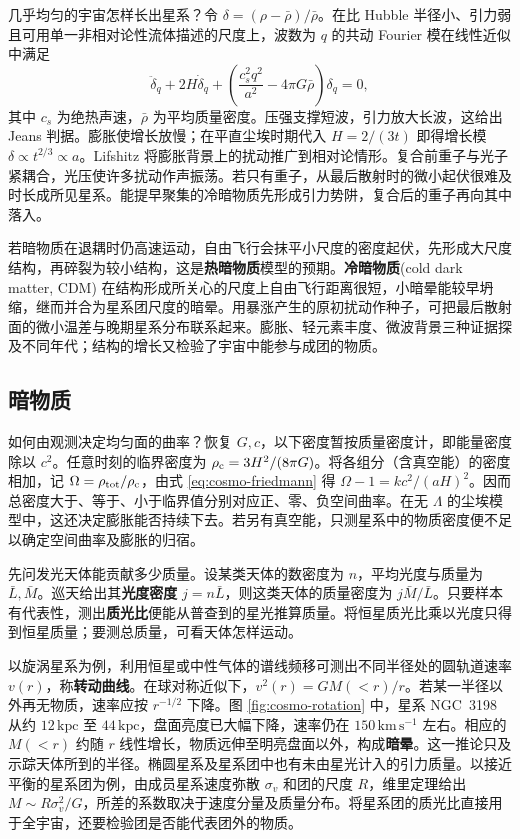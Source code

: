 几乎均匀的宇宙怎样长出星系？令 $\delta=(\rho-\bar\rho)/\bar\rho$。在比 Hubble 半径小、引力弱且可用单一非相对论性流体描述的尺度上，波数为 $q$ 的共动 Fourier 模在线性近似中满足
\[
   \ddot\delta_q+2H\dot\delta_q+
   \left(\frac{c_s^2q^2}{a^2}-4\pi G\bar\rho\right)\delta_q=0 ,
\]
其中 $c_s$ 为绝热声速，$\bar\rho$ 为平均质量密度。压强支撑短波，引力放大长波，这给出 Jeans 判据。膨胀使增长放慢；在平直尘埃时期代入 $H=2/(3t)$ 即得增长模 $\delta\propto t^{2/3}\propto a$。Lifshitz 将膨胀背景上的扰动推广到相对论情形。复合前重子与光子紧耦合，光压使许多扰动作声振荡。若只有重子，从最后散射时的微小起伏很难及时长成所见星系。能提早聚集的冷暗物质先形成引力势阱，复合后的重子再向其中落入。

若暗物质在退耦时仍高速运动，自由飞行会抹平小尺度的密度起伏，先形成大尺度结构，再碎裂为较小结构，这是\textbf{热暗物质}模型的预期。\textbf{冷暗物质}(cold dark matter, CDM) 在结构形成所关心的尺度上自由飞行距离很短，小暗晕能较早坍缩，继而并合为星系团尺度的暗晕。用暴涨产生的原初扰动作种子，可把最后散射面的微小温差与晚期星系分布联系起来。膨胀、轻元素丰度、微波背景三种证据探及不同年代；结构的增长又检验了宇宙中能参与成团的物质。

\subsection{暗物质}\label{sec:cosmo-dark-matter}

如何由观测决定均匀面的曲率？恢复 $G,c$，以下密度暂按质量密度计，即能量密度除以 $c^2$。任意时刻的临界密度为 $\rho_{\rm c}=3H^2/(8\pi G)$。将各组分（含真空能）的密度相加，记 $\Omega=\rho_{\rm tot}/\rho_{\rm c}$，由式 \eqref{eq:cosmo-friedmann} 得 $\Omega-1=kc^2/(aH)^2$。因而总密度大于、等于、小于临界值分别对应正、零、负空间曲率。在无 $\Lambda$ 的尘埃模型中，这还决定膨胀能否持续下去。若另有真空能，只测星系中的物质密度便不足以确定空间曲率及膨胀的归宿。

先问发光天体能贡献多少质量。设某类天体的数密度为 $n$，平均光度与质量为 $\bar L,\bar M$。巡天给出其\textbf{光度密度} $j=n\bar L$，则这类天体的质量密度为 $j\bar M/\bar L$。只要样本有代表性，测出\textbf{质光比}便能从普查到的星光推算质量。将恒星质光比乘以光度只得到恒星质量；要测总质量，可看天体怎样运动。

以旋涡星系为例，利用恒星或中性气体的谱线频移可测出不同半径处的圆轨道速率 $v(r)$，称\textbf{转动曲线}。在球对称近似下，$v^2(r)=GM(<r)/r$。若某一半径以外再无物质，速率应按 $r^{-1/2}$ 下降。图 \ref{fig:cosmo-rotation} 中，星系 NGC~3198 从约 $12\,\mathrm{kpc}$ 至 $44\,\mathrm{kpc}$，盘面亮度已大幅下降，速率仍在 $150\,\mathrm{km\,s^{-1}}$ 左右。相应的 $M(<r)$ 约随 $r$ 线性增长，物质远伸至明亮盘面以外，构成\textbf{暗晕}。这一推论只及示踪天体所到的半径。椭圆星系及星系团中也有未由星光计入的引力质量。以接近平衡的星系团为例，由成员星系速度弥散 $\sigma_v$ 和团的尺度 $R$，维里定理给出 $M\sim R\sigma_v^2/G$，所差的系数取决于速度分量及质量分布。将星系团的质光比直接用于全宇宙，还要检验团是否能代表团外的物质。

